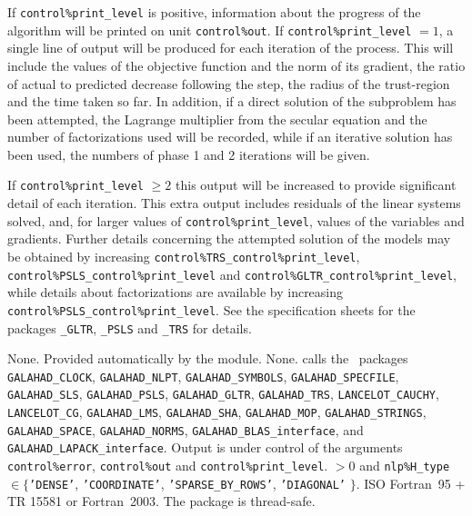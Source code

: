 \documentclass{galahad}
\newcommand{\packagename}{TRB}
\begin{document}

\galinfo
If {\tt control\%print\_level} is positive, information about the progress
of the algorithm will be printed on unit {\tt control\-\%out}.
If {\tt control\%print\_level} $= 1$, a single line of output will be produced
for each iteration of the process.
This will include the values of the objective function and the norm of its
gradient, the ratio of actual to predicted decrease following the step, the
radius of the trust-region and the time taken so far. In addition, if
a direct solution of the subproblem has been attempted, the
Lagrange multiplier from the secular equation and the number of factorizations
used will be recorded, while if an iterative solution has been used, the
numbers of phase 1 and 2 iterations will be given.

If {\tt control\%print\_level} $\geq 2$ this
output will be increased to provide significant detail of each iteration.
This extra output includes residuals of the linear systems solved, and,
for larger values of {\tt control\%print\_level}, values of the variables
and gradients. Further details concerning the attempted solution of the models
may be obtained by increasing
{\tt control\%TRS\_control\%print\_level},
{\tt control\%PSLS\_control\%print\_level}
and
{\tt control\%GLTR\_control\%print\-\_level},
while details about factorizations are available
by increasing
{\tt control\%PSLS\_control\%print\_level}.
See the specification sheets for the packages
{\tt \libraryname\_GLTR},
{\tt \libraryname\_PSLS} and
{\tt \libraryname\_TRS}
for details.


\galgeneral

\galcommon None.
\galworkspace Provided automatically by the module.
\galroutines None.
\galmodules {\tt \packagename\_solve} calls the \galahad\ packages
{\tt GALAHAD\_CLOCK},
{\tt GALAHAD\_NLPT},
{\tt GALAHAD\_SY\-M\-BOLS}, \sloppy
{\tt GALAHAD\_SPECFILE},
{\tt GALAHAD\_SLS},
{\tt GALAHAD\_PSLS},
{\tt GALAHAD\_GLTR},
{\tt GALAHAD\_TRS},
{\tt LANCELOT\_CAUCHY},
{\tt LANCELOT\_CG},
{\tt GALAHAD\_LMS},
{\tt GALAHAD\_SHA},
{\tt GALAHAD\_MOP},
{\tt GALAHAD\_STRINGS},
{\tt GALAHAD\_SPACE},
{\tt GALAHAD\_NORMS},
{\tt GALAHAD\_BLAS\_interface},
and
{\tt GALAHAD\_LAPACK\_interface}.
\galio Output is under control of the arguments
 {\tt control\%error}, {\tt control\%out} and {\tt control\%print\_level}.
 $> 0$ and
{\tt nlp\%H\_type} $\in \{${\tt 'DENSE'},
 {\tt 'COORDINATE'}, {\tt 'SPARSE\_BY\_ROWS'}, {\tt 'DIAGONAL'} $\}$.
\galportability ISO Fortran~95 + TR 15581 or Fortran~2003.
The package is thread-safe.
\end{document}
